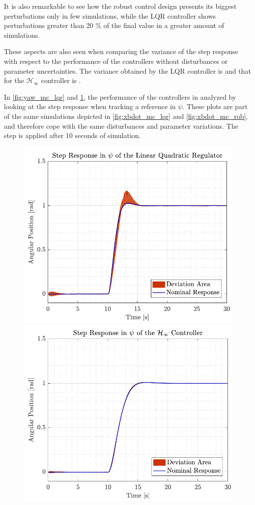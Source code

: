 It is also remarkable to see how the robust control design presents its biggest perturbations only in few simulations, while the LQR controller shows perturbations greater than 20 \% of the final value in a greater amount of simulations.

These aspects are also seen when comparing the variance of the step response with respect to the performance of the controllers without disturbances or parameter uncertainties. The variance obtained by the LQR controller is  and that for the $\mathcal{H}_\infty$ controller is .

In \autoref{fig:yaw_mc_lqr} and \ref{fig:yaw_mc_rob}, the performance of the controllers in analyzed by looking at the step response when tracking a reference in $\psi$. These plots are part of the same simulations depicted in \autoref{fig:xbdot_mc_lqr} and \ref{fig:xbdot_mc_rob}, and therefore cope with the same disturbances and parameter variations. The step is applied after 10 seconds of simulation.
\begin{figure}[H]
    \captionbox 
    {   
        \label{fig:yaw_mc_lqr}
    }                                                                 
    {                                                                  
        \includegraphics[width=.45\textwidth]{figures/yaw_mc_lqr}         
    }                                                                    
    \hspace{5pt}                                                          
    \captionbox  
    {      
        \label{fig:yaw_mc_rob}
    }                                                                          
    {
        \includegraphics[width=.45\textwidth]{figures/yaw_mc_rob}
    }
\end{figure}
